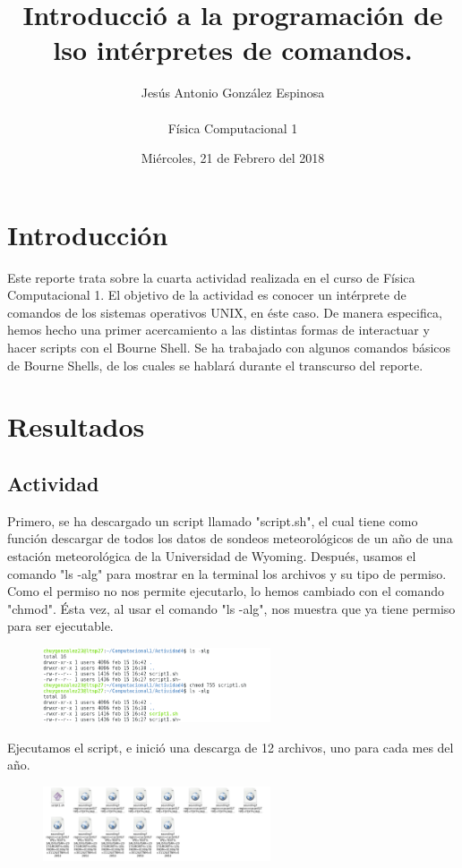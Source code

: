 \documentclass[a4paper]{article}
\title{Introducció a la programación de lso intérpretes de comandos.}
\author{Jesús Antonio González Espinosa \\ \\ Física Computacional 1}
\date{Miércoles, 21 de Febrero del 2018}
\begin{document}
\maketitle

\section{Introducción}
Este reporte trata sobre la cuarta actividad realizada en el curso de Física Computacional 1. El objetivo de la actividad es conocer un intérprete de comandos de los sistemas operativos UNIX, en éste caso. De manera especifica, hemos hecho una primer acercamiento a las distintas formas de interactuar y hacer scripts con el Bourne Shell. Se ha trabajado con algunos comandos básicos de Bourne Shells, de los cuales se hablará durante el transcurso del reporte. 


\section{Resultados}
\subsection{Actividad}
Primero, se ha descargado un script llamado "script.sh", el cual tiene como función descargar de todos los datos de sondeos meteorológicos de un año de una estación meteorológica de la Universidad de Wyoming. Después, usamos el comando "ls -alg" para mostrar en la terminal los archivos y su tipo de permiso. Como el permiso no nos permite ejecutarlo, lo hemos cambiado con el comando "chmod". Ésta vez, al usar el comando "ls -alg", nos muestra que ya tiene permiso para ser ejecutable. 

\begin{figure}[h!]
 \centering
  \includegraphics[width=0.6\textwidth]{PAct1.png}
\end{figure}

Ejecutamos el script, e inició una descarga de 12 archivos, uno para cada mes del año.

\begin{figure}[h!]
 \centering
  \includegraphics[width=0.6\textwidth]{PAct2.png}
\end{figure}
\end{document}
